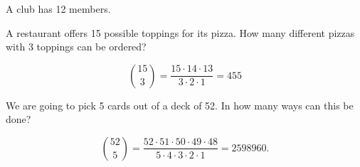 \documentclass[answers,11pt]{exam}
\newcommand{\ignore}[1]{}
\begin{document}
\begin{questions}
\question A club has 12 members.  




\question A restaurant offers 15 possible toppings for its pizza.  How many
different pizzas with 3 toppings can be ordered?

\begin{solution}
\[
  \binom{15}{3} = \frac{15 \cdot 14 \cdot 13}{3 \cdot 2 \cdot 1} = 455
\]
\end{solution}



\question We are going to pick 5 cards out of a deck of 52.  In how many ways
can this be done?

\begin{solution}
\[
  \binom{52}{5}
  = \frac{52 \cdot 51 \cdot 50 \cdot 49 \cdot 48}{5 \cdot 4 \cdot 3 \cdot 2 \cdot 1}
  = 2598960.
\]
\end{solution}



\ignore{
\newpage

\fullwidth{\section*{Advanced Problems}}

}
\end{questions}
\end{document}
